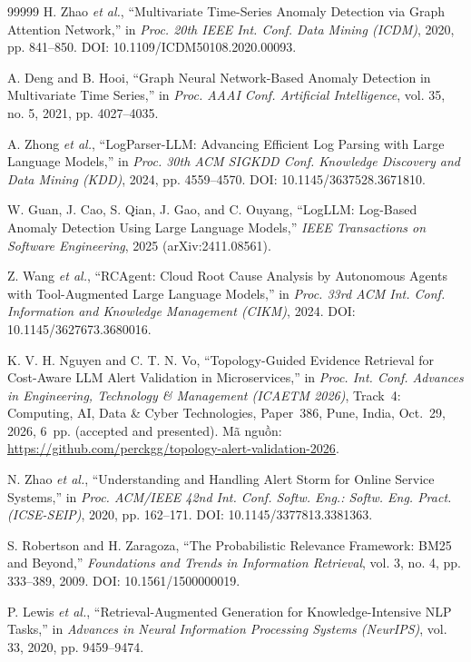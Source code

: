\documentclass[a4paper,table]{article}
\theoremstyle{definition}
\begin{document}
\begin{thebibliography}{99999}
H. Zhao \textit{et al.}, ``Multivariate Time-Series Anomaly Detection via Graph Attention Network,'' in \textit{Proc. 20th IEEE Int. Conf. Data Mining (ICDM)}, 2020, pp. 841--850. DOI: 10.1109/ICDM50108.2020.00093.

A. Deng and B. Hooi, ``Graph Neural Network-Based Anomaly Detection in Multivariate Time Series,'' in \textit{Proc. AAAI Conf. Artificial Intelligence}, vol. 35, no. 5, 2021, pp. 4027--4035.

A. Zhong \textit{et al.}, ``LogParser-LLM: Advancing Efficient Log Parsing with Large Language Models,'' in \textit{Proc. 30th ACM SIGKDD Conf. Knowledge Discovery and Data Mining (KDD)}, 2024, pp. 4559--4570. DOI: 10.1145/3637528.3671810.

W. Guan, J. Cao, S. Qian, J. Gao, and C. Ouyang, ``LogLLM: Log-Based Anomaly Detection Using Large Language Models,'' \textit{IEEE Transactions on Software Engineering}, 2025 (arXiv:2411.08561).

Z. Wang \textit{et al.}, ``RCAgent: Cloud Root Cause Analysis by Autonomous Agents with Tool-Augmented Large Language Models,'' in \textit{Proc. 33rd ACM Int. Conf. Information and Knowledge Management (CIKM)}, 2024. DOI: 10.1145/3627673.3680016.

K. V. H. Nguyen and C. T. N. Vo, ``Topology-Guided Evidence Retrieval for Cost-Aware LLM Alert Validation in Microservices,'' in \textit{Proc. Int. Conf. Advances in Engineering, Technology \& Management (ICAETM 2026)}, Track~4: Computing, AI, Data \& Cyber Technologies, Paper~386, Pune, India, Oct.~29, 2026, 6~pp. (accepted and presented). Mã nguồn: \url{https://github.com/perckgg/topology-alert-validation-2026}.

N. Zhao \textit{et al.}, ``Understanding and Handling Alert Storm for Online Service Systems,'' in \textit{Proc. ACM/IEEE 42nd Int. Conf. Softw. Eng.: Softw. Eng. Pract. (ICSE-SEIP)}, 2020, pp. 162--171. DOI: 10.1145/3377813.3381363.

S. Robertson and H. Zaragoza, ``The Probabilistic Relevance Framework: BM25 and Beyond,'' \textit{Foundations and Trends in Information Retrieval}, vol. 3, no. 4, pp. 333--389, 2009. DOI: 10.1561/1500000019.

P. Lewis \textit{et al.}, ``Retrieval-Augmented Generation for Knowledge-Intensive NLP Tasks,'' in \textit{Advances in Neural Information Processing Systems (NeurIPS)}, vol. 33, 2020, pp. 9459--9474.


\end{thebibliography}
\end{document}

